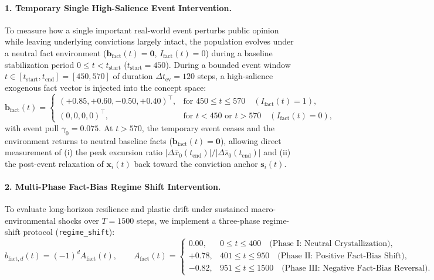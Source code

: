 \documentclass{article}
\begin{document}
\paragraph{1. Temporary Single High-Salience Event Intervention.}
To measure how a single important real-world event perturbs public opinion while leaving underlying convictions largely intact, the population evolves under a neutral fact environment ($\mathbf{b}_{\mathrm{fact}}(t) = \mathbf{0}$, $I_{\mathrm{fact}}(t) = 0$) during a baseline stabilization period $0 \le t < t_{\mathrm{start}}$ ($t_{\mathrm{start}} = 450$). During a bounded event window $t \in [t_{\mathrm{start}}, t_{\mathrm{end}}] = [450, 570]$ of duration $\Delta t_{\mathrm{ev}} = 120$ steps, a high-salience exogenous fact vector is injected into the concept space:
\begin{equation}
    \mathbf{b}_{\mathrm{fact}}(t) =
    \begin{cases}
        (+0.85, +0.60, -0.50, +0.40)^\top, & \text{for } 450 \le t \le 570 \quad (I_{\mathrm{fact}}(t) = 1), \\[4pt]
        (0, 0, 0, 0)^\top, & \text{for } t < 450 \text{ or } t > 570 \quad (I_{\mathrm{fact}}(t) = 0),
    \end{cases}
    \label{eq:single_event_intervention}
\end{equation}
with event pull $\gamma_0 = 0.075$. At $t > 570$, the temporary event ceases and the environment returns to neutral baseline facts ($\mathbf{b}_{\mathrm{fact}}(t) = \mathbf{0}$), allowing direct measurement of (i) the peak excursion ratio $|\Delta \bar{x}_0(t_{\mathrm{end}})| / |\Delta \bar{s}_0(t_{\mathrm{end}})|$ and (ii) the post-event relaxation of $\mathbf{x}_i(t)$ back toward the conviction anchor $\mathbf{s}_i(t)$.

\paragraph{2. Multi-Phase Fact-Bias Regime Shift Intervention.}
To evaluate long-horizon resilience and plastic drift under sustained macro-environmental shocks over $T = 1500$ steps, we implement a three-phase regime-shift protocol (\texttt{regime\_shift}):
\begin{equation}
    b_{\mathrm{fact}, d}(t) = (-1)^d A_{\mathrm{fact}}(t), \qquad
    A_{\mathrm{fact}}(t) =
    \begin{cases}
        0.00, & 0 \le t \le 400 \quad \text{(Phase I: Neutral Crystallization)}, \\[4pt]
        +0.78, & 401 \le t \le 950 \quad \text{(Phase II: Positive Fact-Bias Shift)}, \\[4pt]
        -0.82, & 951 \le t \le 1500 \quad \text{(Phase III: Negative Fact-Bias Reversal)}.
    \end{cases}
    \label{eq:regime_shift_intervention}
\end{equation}
\end{document}
